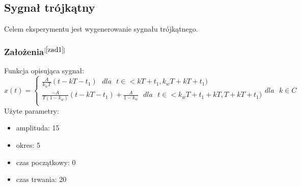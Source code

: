 \documentclass[12pt]{article}
\begin{document}
\subsection{Sygnał trójkątny}
Celem eksperymentu jest wygenerowanie sygnału trójkątnego.
\label{syg3}
\subsubsection{Założenia\( ^{[\ref{zad1}]}\)}
\label{wzor3}
Funkcja opisująca sygnał:
\begin{equation}
x(t) =
\begin{cases}
\frac{A}{k_wT}(t-kT-t_1) \text{ }dla\text{ }t\in <kT+t_1,k_w{T}+k{T}+t_1)\\
\frac{-A}{T(1-k_w)}(t-kT-t_1)+\frac{A}{1-k_w} \text{ }dla\text{ }t\in <k_w{T}+t_1+kT, T+kT+t_1)\\
\end{cases}
dla\text{ } k\in C
\end{equation}
Użyte parametry:
\begin{itemize}
\item amplituda: 15
\item okres: 5
\item czas początkowy: 0
\item czas trwania: 20
\end{itemize}
\end{document}
